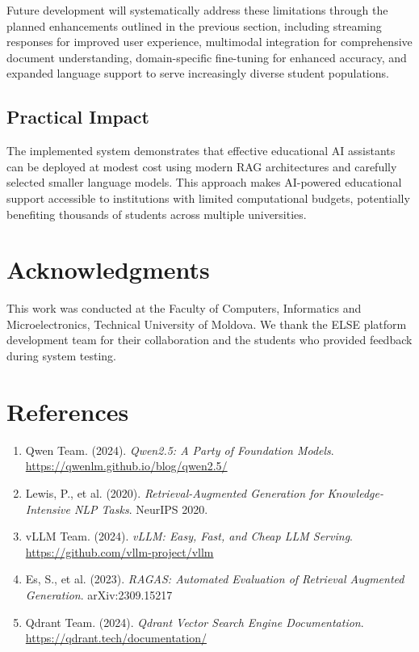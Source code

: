 \documentclass[12pt,a4paper]{article}
\begin{document}
Future development will systematically address these limitations through the planned enhancements outlined in the previous section, including streaming responses for improved user experience, multimodal integration for comprehensive document understanding, domain-specific fine-tuning for enhanced accuracy, and expanded language support to serve increasingly diverse student populations.

\subsection{Practical Impact}
The implemented system demonstrates that effective educational AI assistants can be deployed at modest cost using modern RAG architectures and carefully selected smaller language models. This approach makes AI-powered educational support accessible to institutions with limited computational budgets, potentially benefiting thousands of students across multiple universities.

\section*{Acknowledgments}

This work was conducted at the Faculty of Computers, Informatics and Microelectronics, Technical University of Moldova. We thank the ELSE platform development team for their collaboration and the students who provided feedback during system testing.

\section*{References}

\begin{enumerate}
    \item Qwen Team. (2024). \textit{Qwen2.5: A Party of Foundation Models}. \url{https://qwenlm.github.io/blog/qwen2.5/}
    \item Lewis, P., et al. (2020). \textit{Retrieval-Augmented Generation for Knowledge-Intensive NLP Tasks}. NeurIPS 2020.
    \item vLLM Team. (2024). \textit{vLLM: Easy, Fast, and Cheap LLM Serving}. \url{https://github.com/vllm-project/vllm}
    \item Es, S., et al. (2023). \textit{RAGAS: Automated Evaluation of Retrieval Augmented Generation}. arXiv:2309.15217
    \item Qdrant Team. (2024). \textit{Qdrant Vector Search Engine Documentation}. \url{https://qdrant.tech/documentation/}
\end{enumerate}
\end{document}
